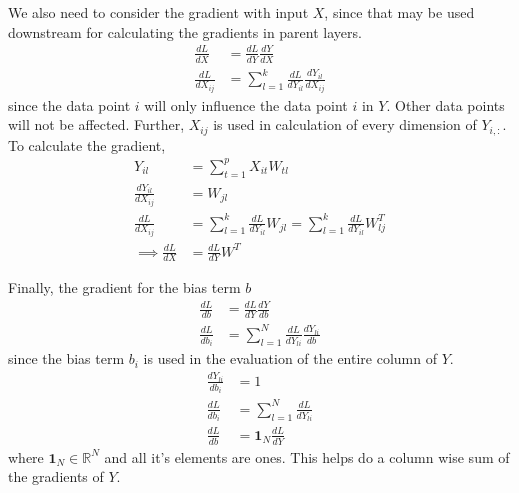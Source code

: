 \documentclass[../../deep_learning_notes.tex]{subfiles}
\begin{document}
We also need to consider the gradient with input $X$, since that may be used downstream for calculating the gradients in parent layers.
\begin{align*}
    \frac{dL}{dX} &= \frac{dL}{dY} \frac{dY}{dX}\\
    \frac{dL}{dX_{ij}} &= \sum_{l=1}^{k} \frac{dL}{dY_{il}} \frac{dY_{il}}{dX_{ij}}
\end{align*}
since the data point $i$ will only influence the data point $i$ in $Y$. Other data points will not be affected. Further, $X_{ij}$ is used in calculation of every dimension of $Y_{i,:}$. To calculate the gradient,
\begin{align*}
    Y_{il} &= \sum_{t=1}^{p} X_{it}W_{tl}\\
    \frac{dY_{il}}{dX_{ij}} &= W_{jl}\\
    \frac{dL}{dX_{ij}} &= \sum_{l=1}^{k} \frac{dL}{dY_{il}}W_{jl}
    = \sum_{l=1}^{k} \frac{dL}{dY_{il}} W_{lj}^{T}\\
    \implies \frac{dL}{dX} &= \frac{dL}{dY} W^{T}
\end{align*}

Finally, the gradient for the bias term $b$
\begin{align*}
    \frac{dL}{db} &= \frac{dL}{dY} \frac{dY}{db}\\
    \frac{dL}{db_{i}} &= \sum_{l=1}^{N} \frac{dL}{dY_{li}} \frac{dY_{li}}{db}
\end{align*}
since the bias term $b_{i}$ is used in the evaluation of the entire column of $Y$.
\begin{align*}
    \frac{dY_{li}}{db_{i}} &= 1\\
    \frac{dL}{db_{i}} &= \sum_{l=1}^{N} \frac{dL}{dY_{li}}\\
    \frac{dL}{db} &= \bm{1}_{N}\frac{dL}{dY}
\end{align*}
where $\bm{1}_{N} \in \mathbb{R}^{N}$ and all it's elements are ones. This helps do a column wise sum of the gradients of $Y$.

\end{document}
